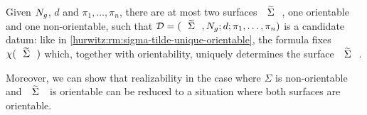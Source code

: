 \egroup

\begin{remark}\label{hurwitz:rm:sigma-tilde-unique-non-orientable}
Given $N_{g}$, $d$ and $\pi_1,\ldots,\pi_n$, there are at most two surfaces $\tSigma$, one orientable and one non-orientable, such that $\DD=\datum{\tSigma,\nosurf{g}}{d}{\pi_1,\ldots,\pi_n}$ is a candidate datum: like in \cref{hurwitz:rm:sigma-tilde-unique-orientable}, the \RH{} formula fixes $\chi(\tSigma)$ which, together with orientability, uniquely determines the surface $\tSigma$.
\end{remark}

Moreover, we can show that realizability in the case where $\Sigma$ is non-orientable and $\tSigma$ is orientable can be reduced to a situation where both surfaces are orientable.

